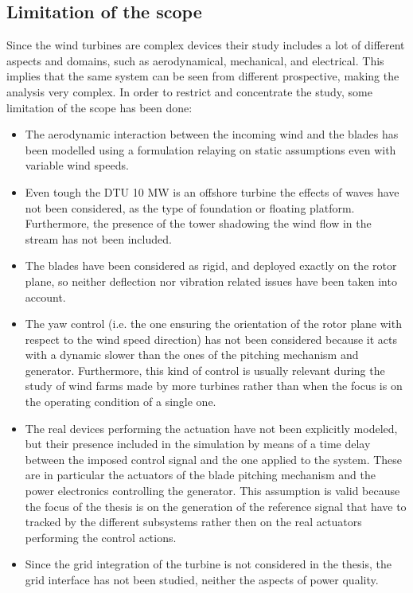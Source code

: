 \subsection{Limitation of the scope}\label{subsec:limitation_of_scope}
Since the wind turbines are complex devices their study includes a lot of different aspects and domains, such as aerodynamical, mechanical, and electrical. This implies that the same system can be seen from different prospective, making the analysis very complex. In order to restrict and concentrate the study, some limitation of the scope has been done:
\begin{itemize}
  \item The aerodynamic interaction between the incoming wind and the blades has been modelled using a formulation relaying on static assumptions even with variable wind speeds.
  \item Even tough the DTU 10 MW is an offshore turbine the effects of waves have not been considered, as the type of foundation or floating platform. Furthermore, the presence of the tower shadowing the wind flow in the stream has not been included.
  \item The blades have been considered as rigid, and deployed exactly on the rotor plane, so neither deflection nor vibration related issues have been taken into account.
  \item The yaw control (i.e. the one ensuring the orientation of the rotor plane with respect to the wind speed direction) has not been considered because it acts with a dynamic slower than the ones of the pitching mechanism and generator. Furthermore, this kind of control is usually relevant during the study of wind farms made by more turbines rather than when the focus is on the operating condition of a single one. 
  \item The real devices performing the actuation have not been explicitly modeled, but their presence included in the simulation by means of a time delay between the imposed control signal and the one applied to the system. These are in particular the actuators of the blade pitching mechanism and the power electronics controlling the generator. This assumption is valid because the focus of the thesis is on the generation of the reference signal that have to tracked by the different subsystems rather then on the real actuators performing the control actions.
  \item Since the grid integration of the turbine is not considered in the thesis, the grid interface has not been studied, neither the aspects of power quality.    
\end{itemize}
